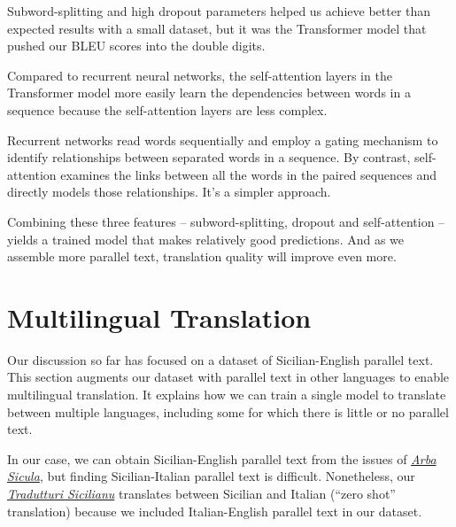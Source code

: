 \documentclass[10pt,letterpaper]{article}
\begin{document}






Subword-splitting and high dropout parameters helped us achieve better than expected results with
a small dataset, but it was the Transformer model that pushed our BLEU scores into the double digits.

Compared to recurrent neural networks, the self-attention layers in the Transformer model more easily
learn the dependencies between words in a sequence because the self-attention layers are less complex.

Recurrent networks read words sequentially and employ a gating mechanism to identify relationships
between separated words in a sequence.  By contrast, self-attention examines the links between all the words
in the paired sequences and directly models those relationships. It's a simpler approach.
      
Combining these three features -- subword-splitting, dropout and self-attention --
yields a trained model that makes relatively good predictions.
And as we assemble more parallel text, translation quality will improve even more.
      

\hypertarget{multilingual}{}

\section*{Multilingual Translation}

Our discussion so far has focused on a dataset of Sicilian-English parallel text.
This section augments our dataset with parallel text in other languages to enable multilingual translation.
It explains how we can train a single model to translate between multiple languages,
including some for which there is little or no parallel text.

In our case, we can obtain Sicilian-English parallel text from the issues of
\href{https://www.arbasicula.org/}{\textit{Arba Sicula}},
but finding Sicilian-Italian parallel text is difficult.  Nonetheless, our
\href{https://translate.napizia.com/}{\textit{Tradutturi Sicilianu}}
translates between Sicilian and Italian (``zero shot'' translation)
because we included Italian-English parallel text in our dataset.
\end{document}
